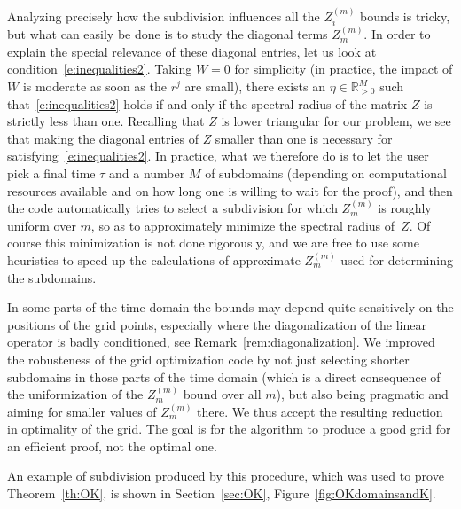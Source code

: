 \documentclass[10pt,a4paper]{article}
\theoremstyle{plain}
\newcommand{\RR}{\mathbb R}
\newcommand{\1}{\mathbf{1}}
\begin{document}
Analyzing precisely how the subdivision influences all the $Z_i^{(m)}$ bounds is tricky, but what can easily be done is to study the diagonal terms $Z_m^{(m)}$. In order to explain the special relevance of these diagonal entries, let us look at condition~\eqref{e:inequalities2}. Taking $W=0$ for simplicity (in practice, the impact of $W$ is moderate as soon as the $r^j$ are small), there exists an $\eta \in \RR_{>0}^M$ such that~\eqref{e:inequalities2} holds if and only if the spectral radius of the matrix $Z$ is strictly less than one. Recalling that $Z$ is lower triangular for our problem, we see that making the diagonal entries of $Z$ smaller than one is necessary for satisfying~\eqref{e:inequalities2}. In practice, what we therefore do is to let the user pick a final time $\tau$ and a number $M$ of subdomains (depending on computational resources available and on how long one is willing to wait for the proof), and then the code automatically tries to select a subdivision for which  $Z_m^{(m)}$ is roughly uniform over $m$, so as to approximately minimize the spectral radius of~$Z$. Of course this minimization is not done rigorously, and we are free to use some heuristics to speed up the calculations of approximate $Z_m^{(m)}$ used for determining the subdomains. 

In some parts of the time domain the bounds may depend quite sensitively on the positions of the grid points, especially where the diagonalization of the linear operator is badly conditioned, see Remark~\ref{rem:diagonalization}. We improved the robusteness of the grid optimization code by not just selecting shorter subdomains in those parts of the time domain (which is a direct consequence of the uniformization of the $Z_m^{(m)}$ bound over all $m$), but also being pragmatic and aiming for smaller values of $Z_m^{(m)}$ there. We thus accept the resulting reduction in optimality of the grid. The goal is for the algorithm to produce a good grid for an efficient proof, not the optimal one. 


An example of subdivision produced by this procedure, which was used to prove Theorem~\ref{th:OK}, is shown in Section~\ref{sec:OK}, Figure~\ref{fig:OKdomainsandK}.
\end{document}
